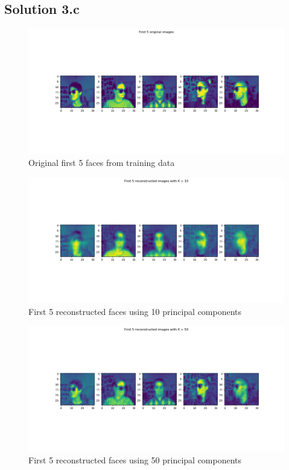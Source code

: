 \subsection*{Solution 3.c}
\begin{figure}[h!]
	\centering
	\includegraphics[scale=0.5]{face_orig}
	\caption{Original first 5 faces from training data}
	\label{fig:face_orig}
\end{figure}
\begin{figure}[h!]
	\centering
	\includegraphics[scale=0.5]{face_pca_10}
	\caption{First 5 reconstructed faces using 10 principal components}
	\label{fig:face_pca_10}
\end{figure}
\begin{figure}[h!]
	\centering
	\includegraphics[scale=0.5]{face_pca_50}
	\caption{First 5 reconstructed faces using 50 principal components}
	\label{fig:face_pca_50}
\end{figure}
